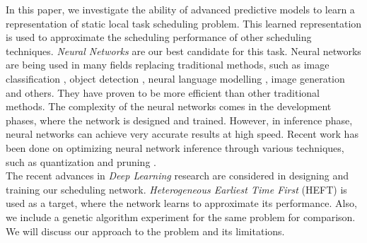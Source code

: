 In this paper, we investigate the ability of advanced predictive models to learn a representation of static local task scheduling problem. This learned representation is used to approximate the scheduling performance of other scheduling techniques. \emph{Neural Networks} are our best candidate for this task. Neural networks are being used in many fields replacing traditional methods, such as image classification \cite{10.1145/3065386}, object detection \cite{ren2015faster}, neural language modelling \cite{ren2015faster}, image generation \cite{karras2019analyzing} and others. They have proven to be more efficient than other traditional methods. The complexity of the neural networks comes in the development phases, where the network is designed and trained. However, in inference phase, neural networks can achieve very accurate results at high speed. Recent work has been done on optimizing neural network inference through various techniques, such as quantization \cite{choukroun2019lowbit} and pruning \cite{yeom2019pruning}. \\

The recent advances in \emph{Deep Learning} research are considered in designing and training our scheduling network. \emph{Heterogeneous Earliest Time First} (HEFT) \cite{993206} is used as a target, where the network learns to approximate its performance. Also, we include a genetic algorithm experiment for the same problem for comparison. We will discuss our approach to the problem and its limitations.